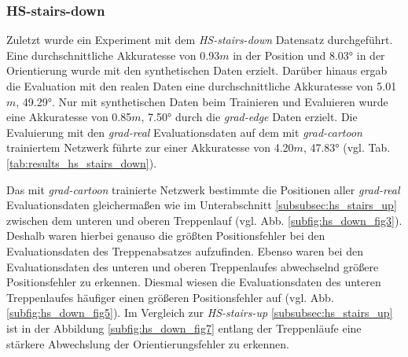 \subsubsection{HS-stairs-down}
\label{subsubsec:hs_stairs_down}



Zuletzt wurde ein Experiment mit dem \textit{HS-stairs-down} Datensatz durchgeführt. Eine durchschnittliche Akkuratesse von 0.93$m$ in der Position und 8.03° in der Orientierung wurde mit den synthetischen Daten erzielt. Darüber hinaus ergab die Evaluation mit den realen Daten eine durchschnittliche Akkuratesse von 5.01$m$, 49.29°. Nur mit synthetischen Daten beim Trainieren und Evaluieren wurde eine Akkuratesse von 0.85$m$, 7.50° durch die \textit{grad-edge} Daten erzielt. Die Evaluierung mit den \textit{grad-real} Evaluationsdaten auf dem mit \textit{grad-cartoon} trainiertem Netzwerk führte zur einer Akkuratesse von 4.20$m$, 47.83° (vgl. Tab. \ref{tab:results_hs_stairs_down}). 

Das mit \textit{grad-cartoon} trainierte Netzwerk bestimmte die Positionen aller \textit{grad-real} Evaluationsdaten gleichermaßen wie im Unterabschnitt \ref{subsubsec:hs_stairs_up} zwischen dem unteren und oberen Treppenlauf (vgl. Abb. \ref{subfig:hs_down_fig3}). Deshalb waren hierbei genauso die größten Positionsfehler bei den Evaluationsdaten des Treppenabsatzes aufzufinden. Ebenso waren bei den Evaluationsdaten des unteren und oberen Treppenlaufes abwechselnd größere Positionsfehler zu erkennen. Diesmal wiesen die Evaluationsdaten des unteren Treppenlaufes häufiger einen größeren Positionsfehler auf (vgl. Abb. \ref{subfig:hs_down_fig5}). Im Vergleich zur \textit{HS-stairs-up} \ref{subsubsec:hs_stairs_up} ist in der Abbildung \ref{subfig:hs_down_fig7} entlang der Treppenläufe eine stärkere Abwechslung der Orientierungsfehler zu erkennen.

